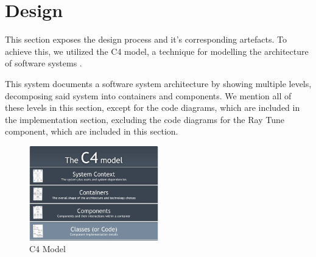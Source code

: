 
\section{Design}

This section exposes the design process and it's corresponding artefacts. To achieve this, we utilized the C4 model, a technique for modelling the architecture of software systems \parencite{Brown_2018}.

This system documents a software system architecture by showing multiple levels, decomposing said system into containers and components. We mention all of these levels in this section, except for the code diagrams, which are included in the implementation section, excluding the code diagrams for the Ray Tune component, which are included in this section.

\begin{figure}[H]
\centering
\includegraphics[width=0.5\textwidth]{images/c4.jpg}
\caption{C4 Model}
\label{fig:c4}
\end{figure}

